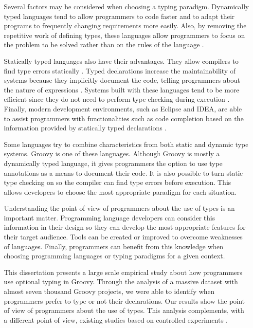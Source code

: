 \documentclass[msc]{ppgccufmg}
\begin{document}
Several factors may be considered when choosing a typing paradigm. 
Dynamically typed languages tend to allow programmers to code faster and to adapt their programs to frequently changing requirements more easily.
Also, by removing the repetitive work of defining types, these languages allow programmers to focus on the problem to be solved rather than on the rules of the language \cite{dynamically_typed_languages}.

Statically typed languages also have their advantages. 
They allow compilers to find type errors statically \cite{should_your_specification_language_be_typed}. 
Typed declarations increase the maintainability of systems because they implicitly document the code, telling programmers about the nature of expressions \cite{type_systems,mayer2012static}. 
Systems built with these languages tend to be more efficient since they do not need to perform type checking during execution \cite{bruce2002foundations,jit}. 
Finally, modern development environments, such as Eclipse and IDEA, are able to assist programmers with functionalities such as code completion based on the information provided by statically typed declarations \cite{bruch2009learning}.

Some languages try to combine characteristics from both static and dynamic type systems.
Groovy \cite{groovy} is one of these languages.
Although Groovy is mostly a dynamically typed language, it gives programmers the option to use type annotations as a means to document their code.
It is also possible to turn static type checking on so the compiler can find type errors before execution.
This allows developers to choose the most appropriate paradigm for each situation.

Understanding the point of view of programmers about the use of types is an important matter.
Programming language developers can consider this information in their design so they can develop the most appropriate features for their target audience.
Tools can be created or improved to overcome weaknesses of languages. 
Finally, programmers can benefit from this knowledge when choosing programming languages or typing paradigms for a given context.

This dissertation presents a large scale empirical study about how programmers use optional typing in Groovy.
Through the analysis of a massive dataset with almost seven thousand Groovy projects, we were able to identify when programmers prefer to type or not their declarations.
Our results show the point of view of programmers about the use of types.
This analysis complements, with a different point of view, existing studies based on controlled experiments \cite{Hanenberg13, ruby_vs_druby, experiment_with_purity, hanenberg_icpc, mayer2012static, Gannon77, Prechelt98}. 
\end{document}
